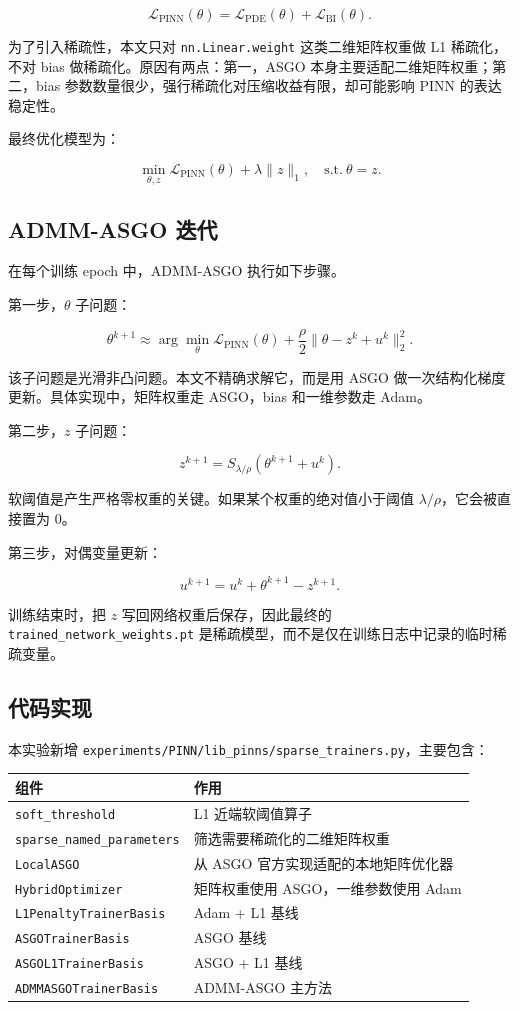 \documentclass[UTF8,a4paper,12pt,fontset=none]{ctexart}
\begin{document}
\[
\mathcal L_{\mathrm{PINN}}(\theta)=\mathcal L_{\mathrm{PDE}}(\theta)+\mathcal L_{\mathrm{BI}}(\theta).
\]

为了引入稀疏性，本文只对 \texttt{nn.Linear.weight} 这类二维矩阵权重做 L1 稀疏化，不对 bias 做稀疏化。原因有两点：第一，ASGO 本身主要适配二维矩阵权重；第二，bias 参数数量很少，强行稀疏化对压缩收益有限，却可能影响 PINN 的表达稳定性。

最终优化模型为：

\[
\min_{\theta,z}\mathcal L_{\mathrm{PINN}}(\theta)+\lambda\|z\|_1,\quad \mathrm{s.t.}\ \theta=z.
\]

\subsection{ADMM-ASGO 迭代}

在每个训练 epoch 中，ADMM-ASGO 执行如下步骤。

第一步，$\theta$ 子问题：

\[
\theta^{k+1}\approx \arg\min_\theta \mathcal L_{\mathrm{PINN}}(\theta)+\frac{\rho}{2}\|\theta-z^k+u^k\|_2^2.
\]

该子问题是光滑非凸问题。本文不精确求解它，而是用 ASGO 做一次结构化梯度更新。具体实现中，矩阵权重走 ASGO，bias 和一维参数走 Adam。

第二步，$z$ 子问题：

\[
z^{k+1}=S_{\lambda/\rho}(\theta^{k+1}+u^k).
\]

软阈值是产生严格零权重的关键。如果某个权重的绝对值小于阈值 $\lambda/\rho$，它会被直接置为 0。

第三步，对偶变量更新：

\[
u^{k+1}=u^k+\theta^{k+1}-z^{k+1}.
\]

训练结束时，把 $z$ 写回网络权重后保存，因此最终的 \texttt{trained\_network\_weights.pt} 是稀疏模型，而不是仅在训练日志中记录的临时稀疏变量。

\subsection{代码实现}

本实验新增 \texttt{experiments/PINN/lib\_pinns/sparse\_trainers.py}，主要包含：

\begingroup
\small
\begin{longtable}{p{}p{}}
\toprule
组件 & 作用 \\
\midrule
\texttt{soft\_threshold} & L1 近端软阈值算子 \\
\texttt{sparse\_named\_parameters} & 筛选需要稀疏化的二维矩阵权重 \\
\texttt{LocalASGO} & 从 ASGO 官方实现适配的本地矩阵优化器 \\
\texttt{HybridOptimizer} & 矩阵权重使用 ASGO，一维参数使用 Adam \\
\texttt{L1PenaltyTrainerBasis} & Adam + L1 基线 \\
\texttt{ASGOTrainerBasis} & ASGO 基线 \\
\texttt{ASGOL1TrainerBasis} & ASGO + L1 基线 \\
\texttt{ADMMASGOTrainerBasis} & ADMM-ASGO 主方法 \\
\bottomrule
\end{longtable}
\endgroup
\end{document}
